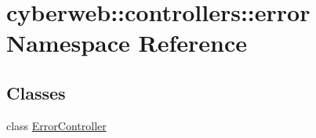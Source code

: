 \hypertarget{namespacecyberweb_1_1controllers_1_1error}{\section{cyberweb\-:\-:controllers\-:\-:error \-Namespace \-Reference}
\label{namespacecyberweb_1_1controllers_1_1error}
}
\subsection*{\-Classes}
\begin{DoxyCompactItemize}
\item 
class \hyperlink{classcyberweb_1_1controllers_1_1error_1_1_error_controller}{\-Error\-Controller}
\end{DoxyCompactItemize}
